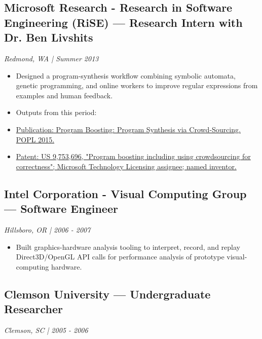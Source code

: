 \documentclass[10pt,letterpaper]{article}
\begin{document}
\subsection*{Microsoft Research - Research in Software Engineering (RiSE) — Research Intern with Dr. Ben Livshits}

\emph{Redmond, WA | Summer 2013}

\begin{itemize}

  \item Designed a program-synthesis workflow combining symbolic automata, genetic programming, and online workers to improve regular expressions from examples and human feedback.

  \item Outputs from this period:

  \item \href{https://www.microsoft.com/en-us/research/publication/program-boosting-program-synthesis-via-crowd-sourcing/}{Publication: Program Boosting: Program Synthesis via Crowd-Sourcing. POPL 2015.}

  \item \href{https://patents.google.com/patent/US9753696B2}{Patent: US 9,753,696, "Program boosting including using crowdsourcing for correctness"; Microsoft Technology Licensing assignee; named inventor.}

\end{itemize}

\subsection*{Intel Corporation - Visual Computing Group — Software Engineer}

\emph{Hillsboro, OR | 2006 - 2007}

\begin{itemize}

  \item Built graphics-hardware analysis tooling to interpret, record, and replay Direct3D/OpenGL API calls for performance analysis of prototype visual-computing hardware.

\end{itemize}

\subsection*{Clemson University — Undergraduate Researcher}

\emph{Clemson, SC | 2005 - 2006}
\end{document}
